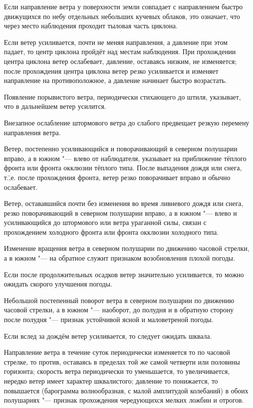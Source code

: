  Если направление ветра у поверхности земли совпадает с
направлением быстро движущихся по небу отдельных небольших кучевых
облаков, это означает, что через место наблюдения проходит тыловая
часть циклона.

 Если ветер усиливается, почти не меняя направления, а давление
при этом падает, то центр циклона пройдёт над местам наблюдения. При
прохождении центра циклона ветер ослабевает, давление, оставаясь
низким, не изменяется; после прохождения центра циклона ветер резко
усиливается и изменяет направление на противоположное, а давление
начинает быстро возрастать.

 Появление порывистого ветра, периодически стихающего до штиля,
указывает, что в дальнейшем ветер усилится.

 Внезапное ослабление штормового ветра до слабого предвещает
резкую перемену направления ветра.

 Ветер, постепенно усиливающийся и поворачивающий в северном
полушарии вправо, а в южном "--- влево от наблюдателя, указывает на
приближение тёплого фронта или фронта окклюзии тёплого типа. После
выпадения дождя или снега, т.\=,е. после прохождения фронта, ветер
резко поворачивает вправо и обычно ослабевает.

 Ветер, остававшийся почти без изменения во время ливневого
дождя или снега, резко поворачивающий в северном полушарии вправо, а
в южном "--- влево и усиливающийся до штормового или ветра ураганной
силы, связан с прохождением холодного фронта или фронта окклюзии
холодного типа.

 Изменение вращения ветра в северном полушарии по движению
часовой стрелки, а в южном "--- на обратное служит признаком возобновления
плохой погоды.

 Если после продолжительных осадков ветер значительно
усиливается, то можно ожидать скорого улучшения погоды.

 Небольшой постепенный поворот ветра в северном полушарии по
движению часовой стрелки, а в южном "--- наоборот, до полудня и в обратную
сторону после полудня "--- признак устойчивой ясной и маловетреной погоды.

 Если вслед за дождём ветер усиливается, то следует ожидать шквала.

 Направление ветра в течение суток периодически изменяется то
по часовой стрелке, то против, оставаясь в пределах той же самой
четверти или половины горизонта; скорость ветра периодически то
уменьшается, то увеличивается, нередко ветер имеет характер
шквалистого; давление то понижается, то повышается (барограмма
волнообразная, с малой амплитудой колебаний) в обоих полушариях "---
признак прохождения чередующихся мелких ложбин и отрогов.

